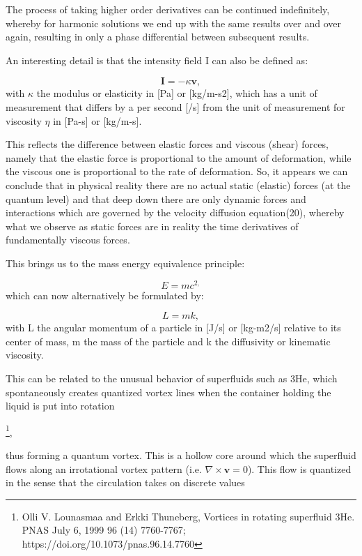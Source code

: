 \documentclass[twoside,final]{article}
\begin{document}
{The process of taking higher order derivatives can be continued indefinitely,
whereby for harmonic solutions we end up with the same results over and over
again, resulting in only a phase differential between subsequent results.  

An interesting detail is that the intensity field I can also be defined as:

\begin{equation}\label{seq:refText26}
\boldsymbol I=-\kappa \boldsymbol v,
\end{equation}
with $\kappa $ the modulus or elasticity in [Pa] or [kg/m-s2], which has a unit
of measurement that differs by a per second [/s] from the unit of measurement
for viscosity $\eta $ in [Pa-s] or [kg/m-s].

This reflects the difference between elastic forces and viscous (shear) forces,
namely that the  elastic force is proportional to the amount of deformation,
while the viscous one is proportional to the rate of deformation. So, it appears
we can conclude that in physical reality there are no actual static (elastic)
forces (at the quantum level) and that deep down there are only dynamic forces
and interactions which are governed by the velocity diffusion equation(20),
whereby what we observe as static forces are in reality the time derivatives of
fundamentally viscous forces.

This brings us to the mass energy equivalence principle:

\begin{equation}
E=\mathit{mc}^{2,}
\end{equation}
which can now alternatively be formulated by:

\begin{equation}\label{seq:refText28}
L=mk,
\end{equation}
with L the angular momentum of a particle in [J/s] or [kg-m2/s] relative to its center of mass, m the mass of the
particle and k the diffusivity or kinematic viscosity. 

This can be related to the unusual behavior of superfluids such as 3He, which
spontaneously creates quantized vortex lines when the container holding the
liquid is put into rotation

\footnote{  Olli V. Lounasmaa and Erkki Thuneberg,
Vortices in rotating superfluid 3He. PNAS July 6, 1999 96 (14) 7760-7767;
https://doi.org/10.1073/pnas.96.14.7760 \par }, 

thus forming a quantum vortex.
This is a hollow core around which the superfluid flows along an irrotational
vortex pattern (i.e. $\nabla \times \boldsymbol v=0$). This flow is
quantized in the sense that the circulation takes on discrete values

}
\end{document}
